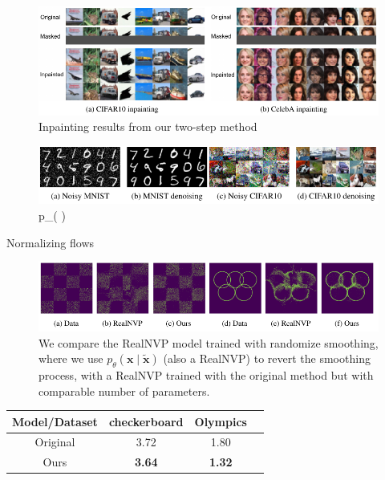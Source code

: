 \documentclass[t]{beamer}  %
\begin{document}
\begin{frame}
\begin{figure}[h]
    \centering
    
    \includegraphics[width=\textwidth]{inpaintings.pdf}
    \caption[c]{Inpainting results from our two-step method}
\end{figure}
\footnotesize\begin{center}
\begin{figure}[h]
    \centering
    
    \includegraphics[width=\textwidth]{unnoise.pdf}
    \caption[c]{ p_{\theta}( \mid {})}
\end{figure}
\end{center}
\end{frame}

\begin{frame}{Normalizing flows \cite{nvp}}
\begin{figure}[h]
    \centering
    
    \includegraphics[width=\textwidth]{flows.pdf}
    \caption[c]{We compare the RealNVP model trained with randomize smoothing, where we use $p_{\theta}(\bm{x} \mid \tilde{\bm{x}})$ (also a RealNVP) to revert the smoothing process, with a RealNVP trained with the original method but with comparable number of parameters.}
\end{figure}
\footnotesize\begin{center}
\begin{tabular}{|c|c|c|c|}
\hline Model/Dataset & checkerboard & Olympics  \\
\hline Original & 3.72 & 1.80 \\
\hline Ours & \textbf{3.64} & \textbf{1.32} \\
\hline
\end{tabular}
\end{center}
\end{frame}




\end{document}
